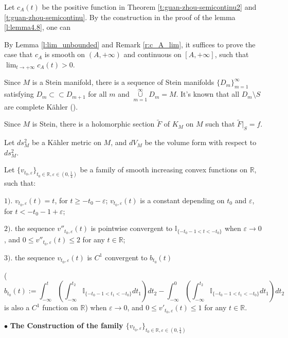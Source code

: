 \begin{Remark}
  \label{r:c_A_lim}
  Let $c_{A}(t)$ be the positive function in Theorem \ref{t:guan-zhou-semicontinu2} and \ref{t:guan-zhou-semicontinu}.
  By the construction in the proof of the lemma \ref{l:lemma4.8},
  one can \textcolor{azure3}{}
  \end{Remark}

By Lemma \ref{l:lim_unbounded} and Remark \ref{r:c_A_lim},
it suffices to prove the case that $c_{A}$ is smooth on $(A,+\infty)$ and continuous on $[A,+\infty]$,
such that $\lim_{t\to+\infty}c_{A}(t)>0$.

Since $M$ is a Stein manifold, there is a sequence of Stein
manifolds $\{D_m\}_{m=1}^\infty$ satisfying $D_m\subset\subset
D_{m+1}$ for all $m$ and
$\overset{\infty}{\underset{m=1}{\cup}}D_m=M$. It's known that all
$D_{m}\setminus S$ are complete K\"{a}hler (\cite{grauert}).

Since $M$ is Stein, there is a holomorphic section $\tilde{F}$ of
$K_{M}$ on $M$ such that $\tilde{F}|_{S}={f}$.

\begin{note}
Let $ds_{M}^{2}$ be a K\"{a}hler metric on $M$, and $dV_{M}$ be the
volume form with respect to $ds_{M}^{2}$.

Let
$\{v_{t_0,\varepsilon}\}_{t_{0}\in\mathbb{R},\varepsilon\in(0,\frac{1}{4})}$
be a family of smooth increasing convex functions on $\mathbb{R}$,
such that:

$1).$ $v_{t_{0},\varepsilon}(t)=t$, for $t\geq-t_{0}-\varepsilon$;
$v_{t_{0},\varepsilon}(t)$ is a constant depending on $t_{0}$ and
$\varepsilon$, for
 $t<-t_{0}-1+\varepsilon$;

$2).$ the sequence $v''_{t_0,\varepsilon}(t)$ is pointwise
convergent to $\mathbb{I}_{\{-t_{0}-1< t<-t_{0}\}}$
 when $\varepsilon\to 0$, and
 $0\leq v''_{t_0,\varepsilon}(t)\leq 2$ for any $t\in \mathbb{R}$;

$3).$ the sequence $v_{t_0,\varepsilon}(t)$ is $C^{1}$ convergent to
$b_{t_{0}}(t)$

($$b_{t_{0}}(t):=\int_{-\infty}^{t}(\int_{-\infty}^{t_{2}}\mathbb{I}_{\{-t_{0}-1<
t_{1}<-t_{0}\}}dt_{1})dt_{2}-\int_{-\infty}^{0}
(\int_{-\infty}^{t_{2}}\mathbb{I}_{\{-t_{0}-1<t_{1}<-t_{0}\}}dt_{1})dt_{2}$$
is also a $C^1$ function on $\mathbb{R}$) when $\varepsilon\to 0$,
and $0\leq v'_{t_0,\varepsilon}(t)\leq1$ for any $t\in \mathbb{R}$.
\end{note}
\noindent $\bullet$ \textbf{The Construction of the family $\{v_{t_0,\varepsilon}\}_{t_{0}\in\mathbb{R},\varepsilon\in(0,\frac{1}{4})}$}



